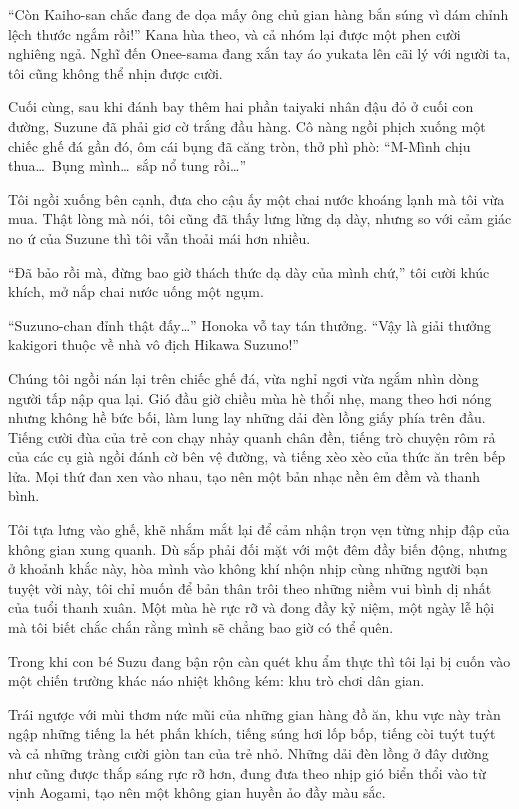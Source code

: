 \documentclass[../main.tex]{subfiles}
\begin{document}
``Còn Kaiho-san chắc đang đe dọa mấy ông chủ gian hàng bắn súng vì dám chỉnh lệch thước ngắm rồi!'' Kana hùa theo, và cả nhóm lại được một phen cười nghiêng ngả. Nghĩ đến Onee-sama đang xắn tay áo yukata lên cãi lý với người ta, tôi cũng không thể nhịn được cười.

Cuối cùng, sau khi đánh bay thêm hai phần taiyaki nhân đậu đỏ ở cuối con đường, Suzune đã phải giơ cờ trắng đầu hàng. Cô nàng ngồi phịch xuống một chiếc ghế đá gần đó, ôm cái bụng đã căng tròn, thở phì phò: ``M-Mình chịu thua\dots\ Bụng mình\dots\ sắp nổ tung rồi\dots''

Tôi ngồi xuống bên cạnh, đưa cho cậu ấy một chai nước khoáng lạnh mà tôi vừa mua. Thật lòng mà nói, tôi cũng đã thấy lưng lửng dạ dày, nhưng so với cảm giác no ứ của Suzune thì tôi vẫn thoải mái hơn nhiều.

``Đã bảo rồi mà, đừng bao giờ thách thức dạ dày của mình chứ,'' tôi cười khúc khích, mở nắp chai nước uống một ngụm.

``Suzuno-chan đỉnh thật đấy\dots'' Honoka vỗ tay tán thưởng. ``Vậy là giải thưởng kakigori thuộc về nhà vô địch Hikawa Suzuno!''

Chúng tôi ngồi nán lại trên chiếc ghế đá, vừa nghỉ ngơi vừa ngắm nhìn dòng người tấp nập qua lại. Gió đầu giờ chiều mùa hè thổi nhẹ, mang theo hơi nóng nhưng không hề bức bối, làm lung lay những dải đèn lồng giấy phía trên đầu. Tiếng cười đùa của trẻ con chạy nhảy quanh chân đền, tiếng trò chuyện rôm rả của các cụ già ngồi đánh cờ bên vệ đường, và tiếng xèo xèo của thức ăn trên bếp lửa. Mọi thứ đan xen vào nhau, tạo nên một bản nhạc nền êm đềm và thanh bình.

Tôi tựa lưng vào ghế, khẽ nhắm mắt lại để cảm nhận trọn vẹn từng nhịp đập của không gian xung quanh. Dù sắp phải đối mặt với một đêm đầy biến động, nhưng ở khoảnh khắc này, hòa mình vào không khí nhộn nhịp cùng những người bạn tuyệt vời này, tôi chỉ muốn để bản thân trôi theo những niềm vui bình dị nhất của tuổi thanh xuân. Một mùa hè rực rỡ và đong đầy kỷ niệm, một ngày lễ hội mà tôi biết chắc chắn rằng mình sẽ chẳng bao giờ có thể quên.


Trong khi con bé Suzu đang bận rộn càn quét khu ẩm thực thì tôi lại bị cuốn vào một chiến trường khác náo nhiệt không kém: khu trò chơi dân gian.

Trái ngược với mùi thơm nức mũi của những gian hàng đồ ăn, khu vực này tràn ngập những tiếng la hét phấn khích, tiếng súng hơi lốp bốp, tiếng còi tuýt tuýt và cả những tràng cười giòn tan của trẻ nhỏ. Những dải đèn lồng ở đây dường như cũng được thắp sáng rực rỡ hơn, đung đưa theo nhịp gió biển thổi vào từ vịnh Aogami, tạo nên một không gian huyền ảo đầy màu sắc.
\end{document}
